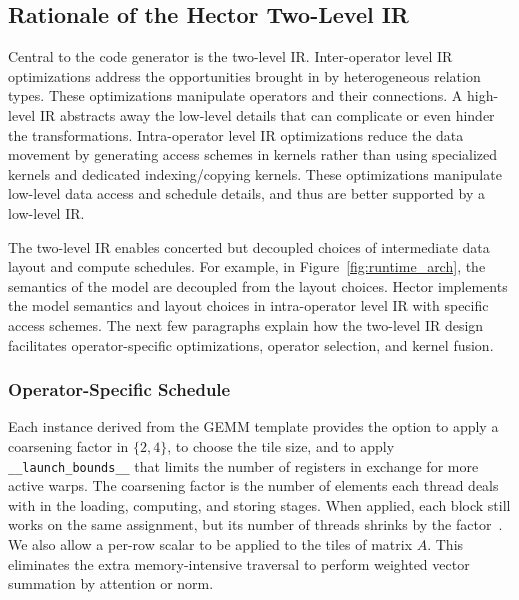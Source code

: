 \subsection{Rationale of the Hector Two-Level IR}
\label{sec:ir_design}

Central to the code generator is the two-level IR.
Inter-operator level IR optimizations address the opportunities brought in by heterogeneous relation types. These optimizations manipulate operators and their connections. A high-level IR %
abstracts away the low-level details that can complicate or even hinder the transformations. 
Intra-operator level IR optimizations reduce the data movement by generating access schemes in kernels rather than using specialized kernels and dedicated indexing/copying kernels. These optimizations manipulate low-level data access and schedule details, and thus are better supported by a low-level IR.


The two-level IR enables concerted but decoupled choices of intermediate data layout and compute schedules.
For example, in Figure~\ref{fig:runtime_arch}, the semantics of the model are decoupled from the layout choices.
Hector implements the model semantics and layout choices in intra-operator level IR with specific access schemes.
The next few paragraphs explain how the two-level IR design facilitates operator-specific optimizations, operator selection, and kernel fusion.

\subsubsection{Operator-Specific Schedule}
\label{sec:op_schedule}
Each instance derived from the GEMM template provides the option to apply a coarsening factor in $\{2,4\}$, to choose the tile size, and to apply \texttt{\_\_launch\_bounds\_\_} that limits the number of registers in exchange for more active warps. 
The coarsening factor is the number of elements each thread deals with in the loading, computing, and storing stages. When applied, each block still works on the same assignment, but its number of threads shrinks by the factor~\cite{PMPP4}.
We also allow a per-row scalar to be applied to the tiles of matrix $A$.
This eliminates the extra memory-intensive traversal to perform weighted vector summation by attention or norm.

